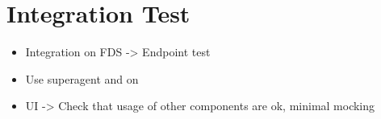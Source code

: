 \section{Integration Test}

  \begin{itemize}
   \item Integration on FDS -> Endpoint test
   \item Use superagent and on
   \item UI -> Check that usage of other components are ok, minimal mocking
  \end{itemize}